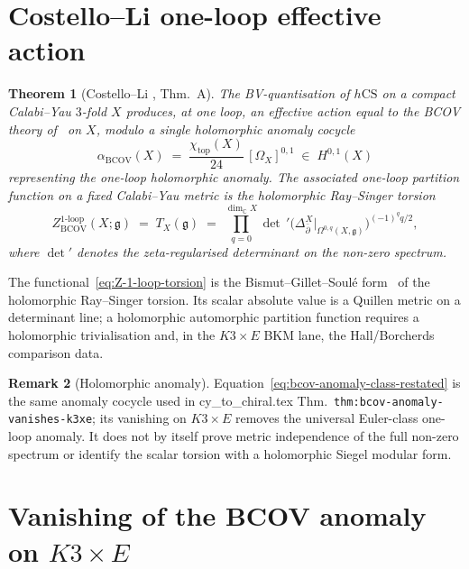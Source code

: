 \documentclass[11pt]{article}
\newtheorem{theorem}{Theorem}[section]
\theoremstyle{definition}
\newtheorem{remark}[theorem]{Remark}
\providecommand{\C}{\mathbb{C}}
\providecommand{\frakg}{\mathfrak{g}}
\renewcommand{\Dbar}{\Delta_{\bar{\partial}}}
\providecommand{\hCS}{h\mathrm{CS}}
\providecommand{\BCOV}{\mathrm{BCOV}}
\providecommand{\det}{\operatorname{det}}
\providecommand{\oneloop}{\mathrm{loop}}
\begin{document}
\section{Costello--Li one-loop effective action}
\label{sec:costello-li-one-loop}

\begin{theorem}[Costello--Li \cite{CL1201.4501}, Thm.~A]
\label{thm:costello-li-bcov}
The BV-quantisation of $\hCS$ on a compact Calabi--Yau $3$-fold
$X$ produces, at one loop, an effective action equal to the BCOV theory
of~\cite{BCOV1993} on $X$, modulo a single holomorphic anomaly cocycle
\begin{equation}
\label{eq:bcov-anomaly-class-restated}
\alpha_{\BCOV}(X) \;=\; \frac{\chi_{\mathrm{top}}(X)}{24}\,[\Omega_X]^{0,1} \;\in\; H^{0,1}(X)
\end{equation}
representing the one-loop holomorphic anomaly. The associated one-loop
partition function on a fixed Calabi--Yau metric is the holomorphic
Ray--Singer torsion
\begin{equation}
\label{eq:Z-1-loop-torsion}
Z^{1\text{-}\oneloop}_{\BCOV}(X;\frakg)
\;=\; T_X(\frakg)
\;=\; \prod_{q=0}^{\dim_\C X}{\det}\,'\!\Big(\Dbar^X\big|_{\Omega^{0,q}(X,\frakg)}\Big)^{(-1)^q q/2},
\end{equation}
where $\det'$ denotes the zeta-regularised determinant on the
non-zero spectrum.
\end{theorem}

The functional~\eqref{eq:Z-1-loop-torsion} is the Bismut--Gillet--Soul\'e
form~\cite{BGS1988,Bismut1986} of the holomorphic Ray--Singer torsion.
Its scalar absolute value is a Quillen metric on a determinant line; a
holomorphic automorphic partition function requires a holomorphic
trivialisation and, in the $K3\times E$ BKM lane, the Hall/Borcherds
comparison data.

\begin{remark}[Holomorphic anomaly]
\label{rem:bcov-anomaly}
Equation~\eqref{eq:bcov-anomaly-class-restated} is the same anomaly
cocycle used in cy\_to\_chiral.tex Thm.~\texttt{thm:bcov-anomaly-vanishes-k3xe};
its vanishing on $K3\times E$ removes the universal Euler-class
one-loop anomaly. It does not by itself prove metric independence of
the full non-zero spectrum or identify the scalar torsion with a
holomorphic Siegel modular form.
\end{remark}

\section{Vanishing of the BCOV anomaly on $K3\times E$}
\label{sec:bcov-vanish-k3e}
\end{document}
